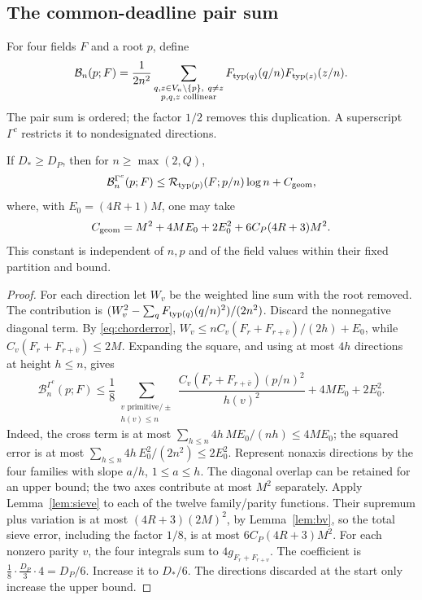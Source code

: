 \subsection{The common-deadline pair sum}
For four fields \(F\) and a root \(p\), define
\begin{equation}\label{eq:pairsum}
 \mathcal B_n(p;F)=\frac1{2n^2}
 \sum_{\substack{q,z\in V_n\setminus\{p\},\ q\ne z\\p,q,z\text{ collinear}}}
 F_{\operatorname{typ}(q)}(q/n)F_{\operatorname{typ}(z)}(z/n).
\end{equation}
The pair sum is ordered; the factor \(1/2\) removes this duplication.
A superscript \(\Gamma^c\) restricts it to nondesignated directions.

\begin{proposition}\label{prop:pair}
If \(D_*\ge D_P\), then for \(n\ge\max(2,Q)\),
\[
 \mathcal B_n^{\Gamma^c}(p;F)
 \le\mathcal R_{\operatorname{typ}(p)}(F;p/n)\log n+C_{\rm geom},
\]
where, with \(E_0=(4R+1)M\), one may take
\begin{equation}\label{eq:geomconstant}
 C_{\rm geom}=M^2+4ME_0+2E_0^2+6C_P(4R+3)M^2.
\end{equation}
This constant is independent of \(n,p\) and of the field values
within their fixed partition and bound.
\end{proposition}
\begin{proof}
For each direction let \(W_v\) be the weighted line sum with the root
removed. The contribution is
\((W_v^2-\sum_qF_{\operatorname{typ}(q)}(q/n)^2)/(2n^2)\).
Discard the nonnegative diagonal term. By \eqref{eq:chorderror},
\(W_v\le nC_v(F_r+F_{r+\bar v})/(2h)+E_0\), while
\(C_v(F_r+F_{r+\bar v})\le2M\). Expanding the square, and using
at most \(4h\) directions at height \(h\le n\), gives
\[
 \mathcal B_n^{\Gamma^c}(p;F)
 \le\frac18\sum_{\substack{v\text{ primitive}/\pm\\h(v)\le n}}
 \frac{C_v(F_r+F_{r+\bar v})(p/n)^2}{h(v)^2}
       +4ME_0+2E_0^2.
\]
Indeed, the cross term is at most
\(\sum_{h\le n}4h\,ME_0/(nh)\le4ME_0\); the squared error is at
most \(\sum_{h\le n}4h\,E_0^2/(2n^2)\le2E_0^2\).
Represent nonaxis directions by the four families with slope
\(a/h\), \(1\le a\le h\). The diagonal overlap can be retained for
an upper bound; the two axes contribute at most \(M^2\) separately.
Apply Lemma~\ref{lem:sieve} to each of the twelve family/parity
functions. Their supremum plus variation is at most
\((4R+3)(2M)^2\), by Lemma~\ref{lem:bv}, so the total sieve error,
including the factor \(1/8\), is at most \(6C_P(4R+3)M^2\).
For each nonzero parity \(v\), the four integrals sum to
\(4g_{F_r+F_{r+v}}\). The coefficient is
\(\tfrac18\cdot\tfrac{D_P}{3}\cdot4=D_P/6\).
Increase it to \(D_*/6\). The directions discarded at the start
only increase the upper bound.
\end{proof}


